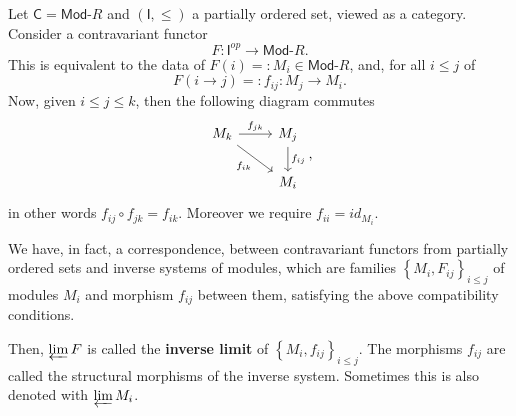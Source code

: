\begin{ex}
	Let $\mathsf{C} = \mathsf{Mod}\text{-}R$ and $\left( \mathsf{I}, \leq \right)$ a partially ordered set, viewed as a category.
	Consider a contravariant functor
	\begin{equation}
	F: \mathsf{I}^{op} \to \mathsf{Mod}\text{-}R
	.\end{equation} 
	This is equivalent to the data of $F(i) =: M_i \in \mathsf{Mod}\text{-}R$, and, for all $i \leq j$ of
	\begin{equation}
		F(i \to j) =: f_{ij}: M_j \to M_i
	.\end{equation} 
	Now, given $i \leq j \leq k$, then the following diagram commutes
	\begin{equation}
	\begin{tikzcd}
		M_k \arrow[r, "f_{jk}", rightarrow] \arrow[rd, "f_{ik}"', rightarrow] &
		M_j \arrow[d, "f_{ij}", rightarrow] \\
		& M_i
	\end{tikzcd}
	,\end{equation} 
	in other words $f_{ij} \circ f_{jk} = f_{ik}$.
	Moreover we require $f_{ii} = id_{M_i}$.

	We have, in fact, a correspondence, between contravariant functors from partially ordered sets and
	inverse systems of modules, which are families $\left\{ M_i, F_{ij} \right\}_{i \leq j}$ of modules $M_i$ and morphism $f_{ij}$ between them, satisfying the above compatibility conditions.

	Then, $\varprojlim F$ is called the \textbf{inverse limit} of $\left\{ M_i, f_{ij} \right\}_{i \leq j}$.
	The morphisms $f_{ij}$ are called the structural morphisms of the inverse system.
	Sometimes this is also denoted with $\varprojlim M_i$.
	

\end{ex}
